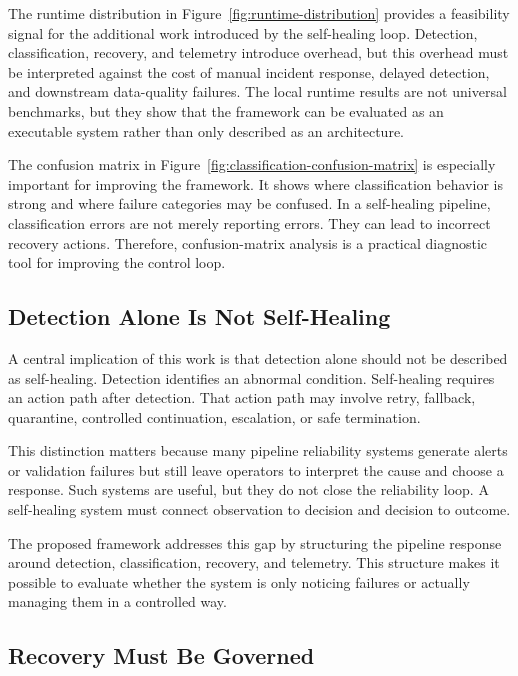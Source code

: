 The runtime distribution in Figure~\ref{fig:runtime-distribution} provides a feasibility signal for the additional work introduced by the self-healing loop. Detection, classification, recovery, and telemetry introduce overhead, but this overhead must be interpreted against the cost of manual incident response, delayed detection, and downstream data-quality failures. The local runtime results are not universal benchmarks, but they show that the framework can be evaluated as an executable system rather than only described as an architecture.

The confusion matrix in Figure~\ref{fig:classification-confusion-matrix} is especially important for improving the framework. It shows where classification behavior is strong and where failure categories may be confused. In a self-healing pipeline, classification errors are not merely reporting errors. They can lead to incorrect recovery actions. Therefore, confusion-matrix analysis is a practical diagnostic tool for improving the control loop.

\subsection{Detection Alone Is Not Self-Healing}

A central implication of this work is that detection alone should not be described as self-healing. Detection identifies an abnormal condition. Self-healing requires an action path after detection. That action path may involve retry, fallback, quarantine, controlled continuation, escalation, or safe termination.

This distinction matters because many pipeline reliability systems generate alerts or validation failures but still leave operators to interpret the cause and choose a response. Such systems are useful, but they do not close the reliability loop. A self-healing system must connect observation to decision and decision to outcome.

The proposed framework addresses this gap by structuring the pipeline response around detection, classification, recovery, and telemetry. This structure makes it possible to evaluate whether the system is only noticing failures or actually managing them in a controlled way.

\subsection{Recovery Must Be Governed}

